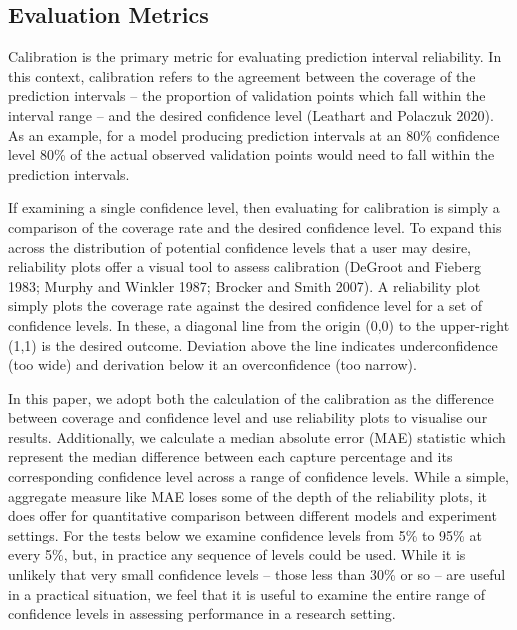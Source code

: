 \documentclass[colTwo]{anon}
\theoremstyle{definition}
\begin{document}
\subsection{Evaluation Metrics}

Calibration is the primary metric for evaluating prediction interval reliability.  In this context, calibration refers to the agreement between the coverage of the prediction intervals -- the proportion of validation points which fall within the interval range -- and the desired confidence level (Leathart and Polaczuk 2020).  As an example, for a model producing prediction intervals at an 80\% confidence level 80\% of the actual observed validation points would need to fall within the prediction intervals.  

If examining a single confidence level, then evaluating for calibration is simply a comparison of the coverage rate and the desired confidence level.  To expand this across the distribution of potential confidence levels that a user may desire, reliability plots offer a visual tool to assess calibration (DeGroot and Fieberg 1983; Murphy and Winkler 1987; Brocker and Smith 2007).  A reliability plot simply plots the coverage rate against the desired confidence level for a set of confidence levels. In these, a diagonal line from the origin (0,0) to the upper-right (1,1) is the desired outcome.  Deviation above the line indicates underconfidence (too wide) and derivation below it an overconfidence (too narrow).  

In this paper, we adopt both the calculation of the calibration as the difference between coverage and confidence level and use reliability plots to visualise our results. Additionally, we calculate a median absolute error (MAE) statistic which represent the median difference between each capture percentage and its corresponding confidence level across a range of confidence levels.  While a simple, aggregate measure like MAE loses some of the depth of the reliability plots, it does offer for quantitative comparison between different models and experiment settings.  For the tests below we examine confidence levels from 5\% to 95\% at every 5\%, but, in practice any sequence of levels could be used.  While it is unlikely that very small confidence levels -- those less than 30\% or so -- are useful in a practical situation, we feel that it is useful to examine the entire range of confidence levels in assessing performance in a research setting. 
\end{document}

